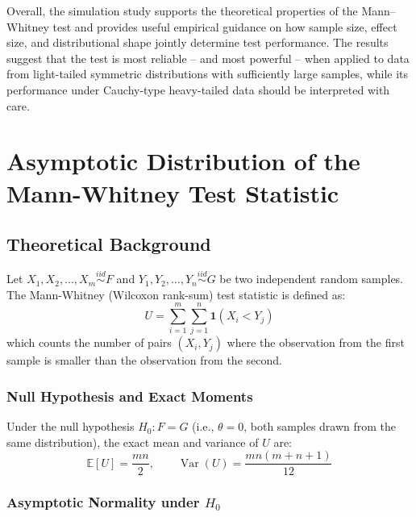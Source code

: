 \documentclass[10pt]{article}
\begin{document}
Overall, the simulation study supports the theoretical properties of the
Mann--Whitney test and provides useful empirical guidance on how sample size,
effect size, and distributional shape jointly determine test performance.  The
results suggest that the test is most reliable -- and most powerful -- when applied
to data from light-tailed symmetric distributions with sufficiently large samples,
while its performance under Cauchy-type heavy-tailed data should be interpreted
with care.




\section{Asymptotic Distribution of the Mann-Whitney Test Statistic}

\subsection{Theoretical Background}

Let $X_1, X_2, \ldots, X_m \overset{iid}{\sim} F$ and $Y_1, Y_2, \ldots, Y_n \overset{iid}{\sim} G$ be two independent random samples. The Mann-Whitney (Wilcoxon rank-sum) test statistic is defined as:
\[
U = \sum_{i=1}^{m} \sum_{j=1}^{n} \mathbf{1}(X_i < Y_j)
\]
which counts the number of pairs $(X_i, Y_j)$ where the observation from the first sample is smaller than the observation from the second.

\subsubsection{Null Hypothesis and Exact Moments}

Under the null hypothesis $H_0: F = G$ (i.e., $\theta = 0$, both samples drawn from the same distribution), the exact mean and variance of $U$ are:
\[
\mathbb{E}[U] = \frac{mn}{2}, \qquad \operatorname{Var}(U) = \frac{mn(m+n+1)}{12}
\]

\subsubsection{Asymptotic Normality under $H_0$}
\end{document}
